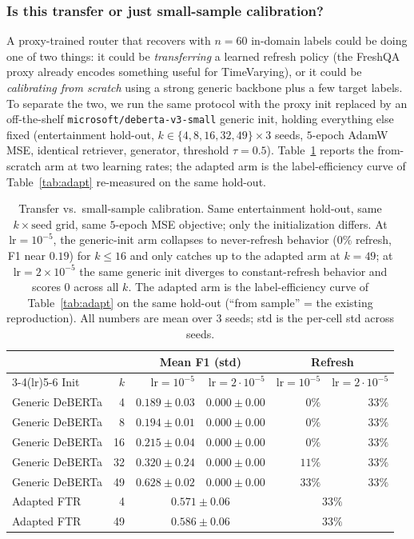 \documentclass[pdflatex,sn-basic]{sn-jnl}
\begin{document}
\subsubsection*{Is this transfer or just small-sample calibration?}
A proxy-trained router that recovers with $n{=}60$ in-domain labels could be doing one of two things: it could be \emph{transferring} a learned refresh policy (the FreshQA proxy already encodes something useful for TimeVarying), or it could be \emph{calibrating from scratch} using a strong generic backbone plus a few target labels. To separate the two, we run the same protocol with the proxy init replaced by an off-the-shelf \texttt{microsoft/deberta-v3-small} generic init, holding everything else fixed (entertainment hold-out, $k{\in}\{4,8,16,32,49\}{\times}3$ seeds, $5$-epoch AdamW MSE, identical retriever, generator, threshold $\tau{=}0.5$). Table~\ref{tab:target-only} reports the from-scratch arm at two learning rates; the adapted arm is the label-efficiency curve of Table~\ref{tab:adapt} re-measured on the same hold-out.

\begin{table}[htbp]
\caption{Transfer vs.\ small-sample calibration. Same entertainment hold-out, same $k{\times}\mathrm{seed}$ grid, same $5$-epoch MSE objective; only the initialization differs. At $\mathrm{lr}{=}10^{-5}$, the generic-init arm collapses to never-refresh behavior ($0\%$ refresh, F1 near $0.19$) for $k{\le}16$ and only catches up to the adapted arm at $k{=}49$; at $\mathrm{lr}{=}2{\times}10^{-5}$ the same generic init diverges to constant-refresh behavior and scores $0$ across all $k$. The adapted arm is the label-efficiency curve of Table~\ref{tab:adapt} on the same hold-out (``from sample'' = the existing reproduction). All numbers are mean over $3$ seeds; std is the per-cell std across seeds.}
\label{tab:target-only}
\centering
\small
\setlength{\tabcolsep}{4pt}
\begin{tabular}{lrrrrr}
\toprule
 & & \multicolumn{2}{c}{\textbf{Mean F1 (std)}} & \multicolumn{2}{c}{\textbf{Refresh}} \\
\cmidrule(lr){3-4}\cmidrule(lr){5-6}
Init & $k$ & $\mathrm{lr}{=}10^{-5}$ & $\mathrm{lr}{=}2{\cdot}10^{-5}$ & $\mathrm{lr}{=}10^{-5}$ & $\mathrm{lr}{=}2{\cdot}10^{-5}$ \\
\midrule
Generic DeBERTa &  4 & $0.189 \pm 0.03$ & $0.000 \pm 0.00$ & $0\%$   & $33\%$ \\
Generic DeBERTa &  8 & $0.194 \pm 0.01$ & $0.000 \pm 0.00$ & $0\%$   & $33\%$ \\
Generic DeBERTa & 16 & $0.215 \pm 0.04$ & $0.000 \pm 0.00$ & $0\%$   & $33\%$ \\
Generic DeBERTa & 32 & $0.320 \pm 0.24$ & $0.000 \pm 0.00$ & $11\%$  & $33\%$ \\
Generic DeBERTa & 49 & $0.628 \pm 0.02$ & $0.000 \pm 0.00$ & $33\%$  & $33\%$ \\
\midrule
Adapted FTR &  4 & \multicolumn{2}{c}{$0.571 \pm 0.06$} & \multicolumn{2}{c}{$33\%$} \\
Adapted FTR & 49 & \multicolumn{2}{c}{$0.586 \pm 0.06$} & \multicolumn{2}{c}{$33\%$} \\
\bottomrule
\end{tabular}
\end{table}
\end{document}
